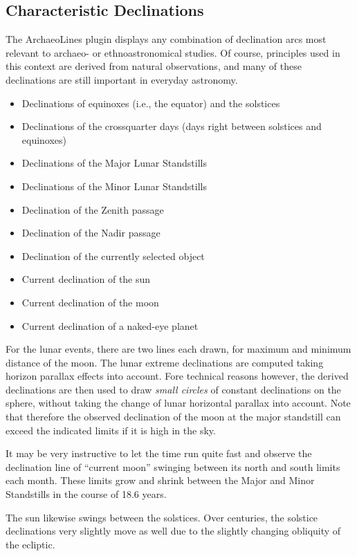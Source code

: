 \subsection{Characteristic Declinations}
\label{sec:plugin:ArchaeoLines:Declinations}


The ArchaeoLines plugin displays any combination of declination arcs most
relevant to archaeo- or ethnoastronomical studies. Of course, principles
used in this context are derived from natural observations, and many of
these declinations are still important in everyday astronomy.

\begin{itemize}
\item Declinations of equinoxes (i.e., the equator) and the solstices
\item Declinations of the crossquarter days (days right between solstices and equinoxes)
\item Declinations of the Major Lunar Standstills
\item Declinations of the Minor Lunar Standstills
\item Declination of the Zenith passage
\item Declination of the Nadir passage
\item Declination of the currently selected object
\item Current declination of the sun
\item Current declination of the moon
\item Current declination of a naked-eye planet
\end{itemize}

\noindent For the lunar events, there are two lines each drawn, for
maximum and minimum distance of the moon.  The lunar extreme
declinations are computed taking horizon parallax effects into
account. Fore technical reasons however, the derived declinations are
then used to draw \emph{small circles} of constant declinations on the
sphere, without taking the change of lunar horizontal parallax into
account.  Note that therefore the observed declination of the moon at
the major standstill can exceed the indicated limits if it is high in
the sky.

It may be very instructive to let the time run quite fast and observe
the declination line of ``current moon'' swinging between its north
and south limits each month.  These limits grow and shrink between the
Major and Minor Standstills in the course of 18.6 years.

The sun likewise swings between the solstices. Over centuries, the
solstice declinations very slightly move as well due to the slightly
changing obliquity of the ecliptic.


